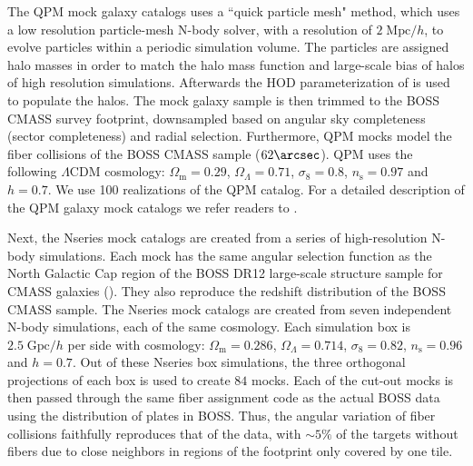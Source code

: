 The QPM mock galaxy catalogs uses a ``quick particle mesh" method, which uses 
a low resolution particle-mesh N-body solver, with a resolution of 
$2\;\mathrm{Mpc}/h$, to evolve particles within a 
periodic simulation volume. The particles are assigned halo masses in order 
to match the halo mass function and large-scale bias of halos of high resolution 
simulations. Afterwards the HOD parameterization of \cite{Tinker:2012aa} is 
used to populate the halos. The mock galaxy sample is then trimmed to the 
BOSS CMASS survey footprint, downsampled based on angular sky completeness 
(sector completeness) and radial selection. Furthermore, QPM mocks model the 
fiber collisions of the BOSS CMASS sample ($62\arcsec$). QPM uses the following 
$\Lambda$CDM cosmology: $\Omega_\mathrm{m} = 0.29$, $\Omega_\Lambda = 0.71$, 
$\sigma_8 = 0.8$, $n_\mathrm{s} = 0.97$ and $h=0.7$. We use 100 realizations 
of the QPM catalog. For a detailed description of the QPM galaxy mock catalogs 
we refer readers to \cite{White:2014aa}. 

Next, the Nseries mock catalogs are created from a series of high-resolution 
N-body simulations. Each mock has the same angular selection function as the 
North Galactic Cap region of the BOSS DR12 large-scale structure sample for 
CMASS galaxies (\citealt{Cuesta:2016aa}). They also reproduce the 
redshift distribution of the BOSS CMASS sample. The Nseries mock catalogs are 
created from seven independent N-body simulations, each of the same cosmology. 
Each simulation box is $2.5\;\mathrm{Gpc}/h$ per side with cosmology: 
$\Omega_\mathrm{m} = 0.286$, $\Omega_\Lambda = 0.714$, $\sigma_8 = 0.82$,
$n_\mathrm{s} = 0.96$ and $h=0.7$. Out of these Nseries box simulations, the 
three orthogonal projections of each box is used to create $84$ mocks.
Each of the cut-out mocks is then passed through the same fiber assignment 
code as the actual BOSS data using the distribution of plates in BOSS. 
Thus, the angular variation of fiber collisions faithfully reproduces 
that of the data, with $\sim 5\%$ of the targets without fibers due to close 
neighbors in regions of the footprint only covered by one tile. 

